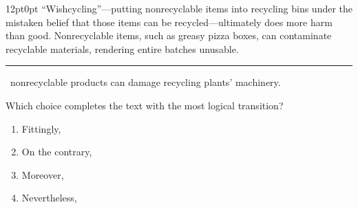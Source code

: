 \documentclass[11pt, twocolumn]{article}
\newcounter{questionnum}
\begin{document}
\vspace{6pt}\noindent
\begin{minipage}{\columnwidth}\raggedright
\noindent{}\par\vspace{8pt}
\begin{adjustwidth}{12pt}{0pt}
``Wishcycling''---putting nonrecyclable items into recycling bins under the mistaken belief that those items can be recycled---ultimately does more harm than good. Nonrecyclable items, such as greasy pizza boxes, can contaminate recyclable materials, rendering entire batches unusable. \,\rule{2cm}{0.4pt}\, nonrecyclable products can damage recycling plants' machinery.
\vspace{6pt}

Which choice completes the text with the most logical transition?
\begin{enumerate}[label=\Alph*),leftmargin=18pt,topsep=3pt,itemsep=2pt]
  \item Fittingly,
  \item On the contrary,
  \item Moreover,
  \item Nevertheless,
\end{enumerate}
\end{adjustwidth}
\end{minipage}\par
\end{document}
